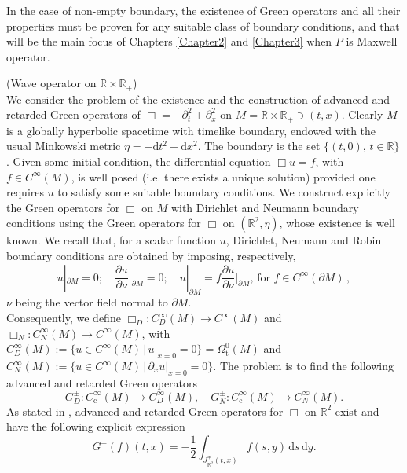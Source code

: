 In the case of non-empty boundary, the existence of Green operators and all their properties must be proven for any suitable class of boundary conditions, and that will be the main focus of Chapters \ref{Chapter2} and \ref{Chapter3} when $P$ is Maxwell operator.

\begin{Example}\label{Ex: wave}(Wave operator on \(\mathbb{R}\times \mathbb{R}_+\))\\
	We consider the problem of the existence and the construction of advanced and retarded Green operators of $\Box=-\partial^2_t+\partial^2_x$ on $M=\mathbb{R}\times \mathbb{R}_+\ni (t,x)$. Clearly $M$ is a globally hyperbolic spacetime with timelike boundary, endowed with the usual Minkowski metric $\eta=-\mathrm{d}t^2+\mathrm{d}x^2$. The boundary is the set $\{(t,0),\, t\in\mathbb{R}\}$. Given some initial condition, the differential equation $\Box u=f$, with $f\in C^\infty(M)$, is well posed (i.e. there exists a unique solution) provided one requires $u$ to satisfy some suitable boundary conditions. We construct explicitly the Green operators for $\Box$ on $M$ with Dirichlet and Neumann boundary conditions using the Green operators for $\Box$ on $(\mathbb{R}^2,\eta)$, whose existence is well known. We recall that, for a scalar function $u$, Dirichlet, Neumann and Robin boundary conditions are obtained by imposing, respectively,
	\[	u|_{\partial M}=0;\quad \frac{\partial u}{\partial \nu}\Big|_{\partial M}=0;\quad u|_{\partial M}= f \frac{\partial u}{\partial \nu}\Big|_{\partial M},\,\text{for }f\in C^\infty(\partial M)\,,	\]
	$\nu$ being the vector field normal to $\partial M$.\\
	Consequently, we define $\Box_D:C^\infty_D(M)\to C^\infty (M)$ and $\Box_N:C^\infty_N(M)\to C^\infty (M)$, with $C^\infty_D(M):=\{ u\in C^\infty(M)\,|\, u|_{x=0}=0 \}=\Omega^0_\mathrm{t}(M)$ and $C^\infty_N(M):=\{ u\in C^\infty(M)\,|\, \partial_x u|_{x=0}=0 \}$.
	The problem is to find the following advanced and retarded Green operators 
	\begin{equation}
		G^\pm_D:C_\mathrm{c}^\infty(M)\to C^\infty_D(M),\quad G^\pm_N:C_\mathrm{c}^\infty(M)\to C^\infty_N(M).
	\end{equation}
	As stated in \cite[Ex. 3.4]{Baer-15}, advanced and retarded Green operators for $\Box$ on $\mathbb{R}^2$ exist and have the following explicit expression
	\begin{equation}
		G^\pm (f)(t,x)=-\frac12 \int_{J_{\mathbb{R}^2}^\mp(t,x)} f(s,y)\,\mathrm{d}s\,\mathrm{d}y.
	\end{equation}

\end{Example}
